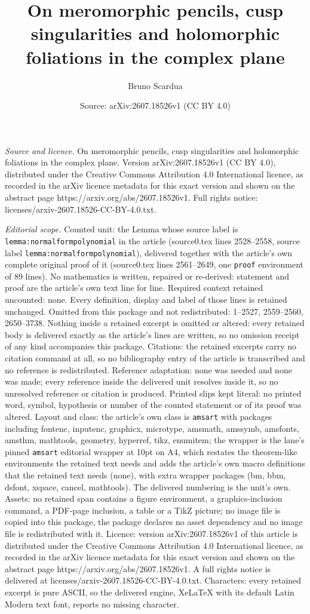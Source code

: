 \documentclass[10pt,a4paper]{amsart}
\title[On meromorphic pencils, cusp singularities and holomorphic f]{On meromorphic pencils, cusp singularities and holomorphic foliations in the complex plane}
\author{Bruno Scardua}
\date{Source: arXiv:2607.18526v1 (CC BY 4.0)}
\begin{document}
\maketitle

\noindent\emph{Source and licence.} On meromorphic pencils, cusp singularities and holomorphic foliations in the complex plane. Version arXiv:2607.18526v1 (CC BY 4.0), distributed under the Creative Commons Attribution 4.0 International licence, as recorded in the arXiv licence metadata for this exact version and shown on the abstract page https://arxiv.org/abs/2607.18526v1. Full rights notice: licenses/arxiv-2607.18526-CC-BY-4.0.txt.\par\smallskip

\noindent\textit{Editorial scope.} Counted unit: the Lemma whose source label is \texttt{lemma:normalformpolynomial} in the article (source0.tex lines 2528--2558, source label \texttt{lemma:normalformpolynomial}), delivered together with the article's own complete original proof of it (source0.tex lines 2561--2649, one \texttt{proof} environment of 89 lines). No mathematics is written, repaired or re-derived: statement and proof are the article's own text line for line. Required context retained uncounted: none. Every definition, display and label of those lines is retained unchanged. Omitted from this package and not redistributed: 1--2527, 2559--2560, 2650--3738. Nothing inside a retained excerpt is omitted or altered: every retained body is delivered exactly as the article's lines are written, so no omission receipt of any kind accompanies this package. Citations: the retained excerpts carry no citation command at all, so no bibliography entry of the article is transcribed and no reference is redistributed. Reference adaptation: none was needed and none was made; every reference inside the delivered unit resolves inside it, so no unresolved reference or citation is produced. Printed slips kept literal: no printed word, symbol, hypothesis or number of the counted statement or of its proof was altered. Layout and class: the article's own class is \texttt{amsart} with packages including fontenc, inputenc, graphicx, microtype, amsmath, amssymb, amsfonts, amsthm, mathtools, geometry, hyperref, tikz, enumitem; the wrapper is the lane's pinned \texttt{amsart} editorial wrapper at 10pt on A4, which restates the theorem-like environments the retained text needs and adds the article's own macro definitions that the retained text needs (none), with extra wrapper packages (bm, bbm, dsfont, xspace, cancel, mathtools). The delivered numbering is the unit's own. Assets: no retained span contains a figure environment, a graphics-inclusion command, a PDF-page inclusion, a table or a TikZ picture; no image file is copied into this package, the package declares no asset dependency and no image file is redistributed with it. Licence: version arXiv:2607.18526v1 of this article is distributed under the Creative Commons Attribution 4.0 International licence, as recorded in the arXiv licence metadata for this exact version and shown on the abstract page https://arxiv.org/abs/2607.18526v1. A full rights notice is delivered at licenses/arxiv-2607.18526-CC-BY-4.0.txt. Characters: every retained excerpt is pure ASCII, so the delivered engine, XeLaTeX with its default Latin Modern text font, reports no missing character.
\end{document}
